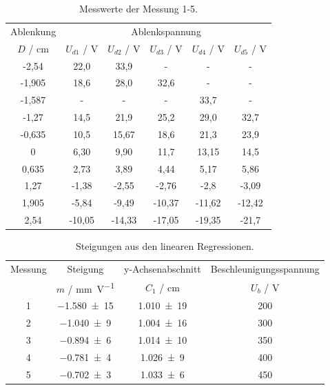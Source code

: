\begin{table}
  \centering
  \caption{Messwerte der Messung 1-5.}
  \label{tab:1}
  \begin{tabular}{c | c c c c c }
    \toprule
    Ablenkung & \multicolumn{5}{c}{Ablenkspannung} \\
    $D$ / \si{\centi\meter} & $U_{d1}$ / \si{\volt} & $U_{d2}$ / \si{\volt} & $U_{d3}$ / \si{\volt} & $U_{d4}$ / \si{\volt} & $U_{d5}$ / \si{\volt}  \\
    \midrule
    -2,54  & 22,0   & 33,9   & -       & -      & -     \\
    -1,905 & 18,6   & 28,0   & 32,6    & -      & -      \\
    -1,587 & -      & -      & -       & 33,7   & -      \\
    -1,27  & 14,5   & 21,9   & 25,2    & 29,0   & 32,7   \\
    -0,635 & 10,5   & 15,67  & 18,6    & 21,3   & 23,9   \\
    0     & 6,30   & 9,90   & 11,7    & 13,15  & 14,5   \\
    0,635  & 2,73   & 3,89   & 4,44    & 5,17   & 5,86   \\
    1,27   & -1,38  & -2,55  & -2,76   & -2,8   & -3,09  \\
    1,905  & -5,84  & -9,49  & -10,37  & -11,62 & -12,42 \\
    2,54   & -10,05 & -14,33 & -17,05  & -19,35 & -21,7  \\
    \bottomrule
  \end{tabular}
\end{table}

\begin{table}
  \centering
  \caption{Steigungen aus den linearen Regressionen.}
  \label{tab:2}
  \begin{tabular}{c | c c| c }
    \toprule
    Messung & Steigung & y-Achsenabschnitt & Beschleunigungsspannung \\
     & $m$ / \si{\milli\meter\per\volt} & $C_1$ / \si{\centi\meter} & $U_b$ / \si{\volt} \\
    \midrule
    1 & \num{-1,580(15)} & \num{1,010(19)}  &  200 \\
    2 & \num{-1,040(9)} &  \num{1,004(16)}  & 300 \\
    3 & \num{-0,894(6)} &  \num{1,014(10)}  & 350 \\
    4 & \num{-0,781(4)} &  \num{1,026(9)}  & 400 \\
    5 & \num{-0,702(3)} &  \num{1,033(6)}  & 450 \\
    \bottomrule
  \end{tabular}
\end{table}

